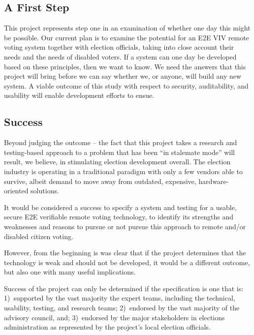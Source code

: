 \subsection{A First Step}
\label{sec:first-step}

This project represents step one in an examination of whether one day
this might be possible. Our current plan is to examine the potential
for an E2E VIV remote voting system together with election officials,
taking into close account their needs and the needs of disabled
voters. If a system can one day be developed based on these
principles, then we want to know. We need the answers that this
project will bring before we can say whether we, or anyone, will build
any new system. A viable outcome of this study with respect to
security, auditability, and usability will enable development efforts
to ensue.

\subsection{Success}
\label{sec:success}

Beyond judging the outcome – the fact that this project takes a
research and testing-based approach to a problem that has been “in
stalemate mode” will result, we believe, in stimulating election
development overall. The election industry is operating in a
traditional paradigm with only a few vendors able to survive, albeit
demand to move away from outdated, expensive, hardware-oriented
solutions.

It would be considered a success to specify a system and testing for a
usable, secure E2E verifiable remote voting technology, to identify
its strengths and weaknesses and reasons to pursue or not pursue this
approach to remote and/or disabled citizen voting.

However, from the beginning is was clear that if the project
determines that the technology is weak and should not be developed, it
would be a different outcome, but also one with many useful
implications. 

Success of the project can only be determined if the specification is
one that is: 1)~supported by the vast majority the expert teams,
including the technical, usability, testing, and research teams;
2)~endorsed by the vast majority of the advisory council, and;
3)~endorsed by the major stakeholders in elections administration as
represented by the project's local election officials.

